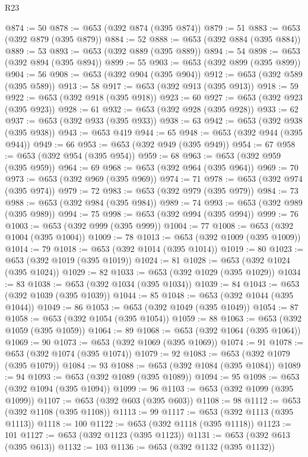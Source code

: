 \begin{lexlean}{R23}
\begin{coremodule}
@874 := 50
@878 := @653 (@392 @874 (@395 @874))
@879 := 51
@883 := @653 (@392 @879 (@395 @879))
@884 := 52
@888 := @653 (@392 @884 (@395 @884))
@889 := 53
@893 := @653 (@392 @889 (@395 @889))
@894 := 54
@898 := @653 (@392 @894 (@395 @894))
@899 := 55
@903 := @653 (@392 @899 (@395 @899))
@904 := 56
@908 := @653 (@392 @904 (@395 @904))
@912 := @653 (@392 @589 (@395 @589))
@913 := 58
@917 := @653 (@392 @913 (@395 @913))
@918 := 59
@922 := @653 (@392 @918 (@395 @918))
@923 := 60
@927 := @653 (@392 @923 (@395 @923))
@928 := 61
@932 := @653 (@392 @928 (@395 @928))
@933 := 62
@937 := @653 (@392 @933 (@395 @933))
@938 := 63
@942 := @653 (@392 @938 (@395 @938))
@943 := @653 @419
@944 := 65
@948 := @653 (@392 @944 (@395 @944))
@949 := 66
@953 := @653 (@392 @949 (@395 @949))
@954 := 67
@958 := @653 (@392 @954 (@395 @954))
@959 := 68
@963 := @653 (@392 @959 (@395 @959))
@964 := 69
@968 := @653 (@392 @964 (@395 @964))
@969 := 70
@973 := @653 (@392 @969 (@395 @969))
@974 := 71
@978 := @653 (@392 @974 (@395 @974))
@979 := 72
@983 := @653 (@392 @979 (@395 @979))
@984 := 73
@988 := @653 (@392 @984 (@395 @984))
@989 := 74
@993 := @653 (@392 @989 (@395 @989))
@994 := 75
@998 := @653 (@392 @994 (@395 @994))
@999 := 76
@1003 := @653 (@392 @999 (@395 @999))
@1004 := 77
@1008 := @653 (@392 @1004 (@395 @1004))
@1009 := 78
@1013 := @653 (@392 @1009 (@395 @1009))
@1014 := 79
@1018 := @653 (@392 @1014 (@395 @1014))
@1019 := 80
@1023 := @653 (@392 @1019 (@395 @1019))
@1024 := 81
@1028 := @653 (@392 @1024 (@395 @1024))
@1029 := 82
@1033 := @653 (@392 @1029 (@395 @1029))
@1034 := 83
@1038 := @653 (@392 @1034 (@395 @1034))
@1039 := 84
@1043 := @653 (@392 @1039 (@395 @1039))
@1044 := 85
@1048 := @653 (@392 @1044 (@395 @1044))
@1049 := 86
@1053 := @653 (@392 @1049 (@395 @1049))
@1054 := 87
@1058 := @653 (@392 @1054 (@395 @1054))
@1059 := 88
@1063 := @653 (@392 @1059 (@395 @1059))
@1064 := 89
@1068 := @653 (@392 @1064 (@395 @1064))
@1069 := 90
@1073 := @653 (@392 @1069 (@395 @1069))
@1074 := 91
@1078 := @653 (@392 @1074 (@395 @1074))
@1079 := 92
@1083 := @653 (@392 @1079 (@395 @1079))
@1084 := 93
@1088 := @653 (@392 @1084 (@395 @1084))
@1089 := 94
@1093 := @653 (@392 @1089 (@395 @1089))
@1094 := 95
@1098 := @653 (@392 @1094 (@395 @1094))
@1099 := 96
@1103 := @653 (@392 @1099 (@395 @1099))
@1107 := @653 (@392 @603 (@395 @603))
@1108 := 98
@1112 := @653 (@392 @1108 (@395 @1108))
@1113 := 99
@1117 := @653 (@392 @1113 (@395 @1113))
@1118 := 100
@1122 := @653 (@392 @1118 (@395 @1118))
@1123 := 101
@1127 := @653 (@392 @1123 (@395 @1123))
@1131 := @653 (@392 @613 (@395 @613))
@1132 := 103
@1136 := @653 (@392 @1132 (@395 @1132))

\end{coremodule}
\end{lexlean}
